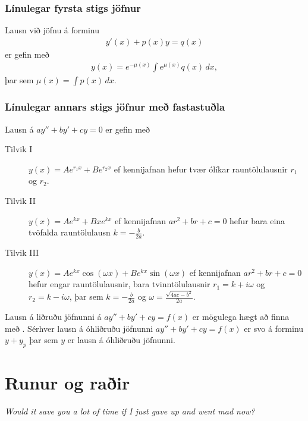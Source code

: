 \documentclass[b5paper,11pt,icelandic]{sphinxmanual}
\begin{document}
\subsection{Línulegar fyrsta stigs jöfnur}
\label{kafli08:linulegar-fyrsta-stigs-jofnur}
Lausn við jöfnu á forminu
\begin{equation*}
\begin{split}y'(x) + p(x)y = q(x)\end{split}
\end{equation*}
er gefin með
\begin{equation*}
\begin{split}y(x) = e^{-\mu(x)} \int e^{\mu(x)} q(x)\, dx,\end{split}
\end{equation*}
þar sem \(\mu(x) = \int p(x)\, dx\).


\subsection{Línulegar annars stigs jöfnur með fastastuðla}
\label{kafli08:linulegar-annars-stigs-jofnur-me-fastastula}
Lausn á \(ay''+by'+cy=0\) er gefin með
\begin{description}
\item[{Tilvik I}] \leavevmode
\(y(x)=Ae^{r_1x}+Be^{r_2x}\)
ef kennijafnan hefur tvær ólíkar rauntölulausnir \(r_1\) og
\(r_2\).

\item[{Tilvik II}] \leavevmode
\(y(x)=Ae^{kx}+Bxe^{kx}\)
ef kennijafnan \(ar^2+br+c=0\) hefur bara eina tvöfalda rauntölulausn
\(k=-\frac{b}{2a}\).

\item[{Tilvik III}] \leavevmode
\(y(x)=Ae^{kx}\cos(\omega x)+Be^{kx}\sin(\omega x)\)
ef kennijafnan \(ar^2+br+c=0\) hefur engar rauntölulausnir,
bara tvinntölulausnir \(r_1=k+i\omega\) og
\(r_2=k-i\omega\), þar sem
\(k=-\frac{b}{2a}\) og \(\omega=\frac{\sqrt{4ac-b^2}}{2a}\).

\end{description}

Lausn á liðruðu jöfnunni  á \(ay''+by'+cy=f(x)\) er mögulega hægt að finna
með {\hyperref[kafli08:agiskun]{}}. Sérhver lausn á óhliðruðu jöfnunni \(ay''+by'+cy=f(x)\)
er svo á forminu \(y+y_p\) þar sem \(y\) er
lausn á óhliðruðu jöfnunni.


\chapter{Runur og raðir}
\label{kafli09:runur-og-rair}\label{kafli09::doc}
\emph{Would it save you a lot of time if I just gave up and went mad now?}
\end{document}
